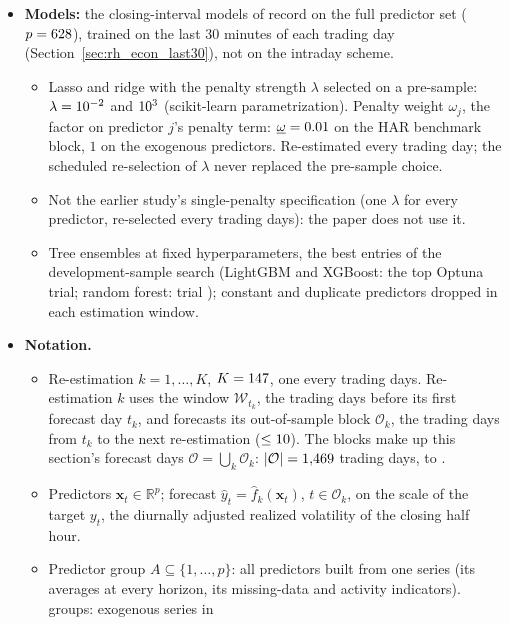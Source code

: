 \begin{itemize}
\item \textbf{Models:} the closing-interval models of record on the full predictor set ($p = 628$), trained on
  the last 30 minutes of each trading day (Section~\ref{sec:rh_econ_last30}), not on the intraday scheme.
  \begin{itemize}
  \item Lasso and ridge with the penalty strength $\lambda$ selected on a pre-sample: $\lambda = 10^{-2}$ and
    $10^{3}$ (scikit-learn parametrization). Penalty weight $\omega_j$, the factor on predictor $j$'s penalty
    term: $\underline{\omega} = 0.01$ on the HAR benchmark block, $1$ on the exogenous predictors.
    Re-estimated every trading day; the scheduled re-selection of $\lambda$ never replaced the pre-sample choice.
  \item Not the earlier study's single-penalty specification (one $\lambda$ for every predictor, re-selected every
    \rhfiOldBlock{} trading days): the paper does not use it.
  \item Tree ensembles at fixed hyperparameters, the best entries of the development-sample search (LightGBM and
    XGBoost: the top Optuna trial; random forest: trial \rhdmRfTrial); constant and duplicate predictors dropped in
    each estimation window.
  \end{itemize}
\item \textbf{Notation.}
  \begin{itemize}
  \item Re-estimation $k = 1, \dots, K$, $K = 147$, one every \rhfiRefitEvery{} trading days. Re-estimation
    $k$ uses the window $\mathcal W_{t_k}$, the \rhfiWindow{} trading days before its first forecast day $t_k$, and
    forecasts its out-of-sample block $\mathcal O_k$, the trading days from $t_k$ to the next re-estimation
    ($\le 10$).
    The blocks make up this section's forecast days $\mathcal O = \bigcup_k \mathcal O_k$:
    $|\mathcal O| = 1{,}469$ trading days, \rhfiFirst{} to \rhfiLast.
  \item Predictors $\bm x_t \in \mathbb{R}^p$; forecast $\hat y_t = \hat f_k(\bm x_t)$, $t \in \mathcal O_k$, on the
    scale of the target $y_t$, the diurnally adjusted realized volatility of the closing half hour.
  \item Predictor group $A \subseteq \{1, \dots, p\}$: all predictors built from one series (its averages at every
    horizon, its missing-data and activity indicators). \rhfiNUnits{} groups: \rhfiNExog{} exogenous series in

\end{itemize}
\end{itemize}
